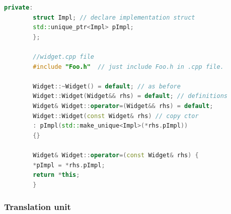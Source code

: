 \documentclass[a4paper,12pt,twoside]{book}
\begin{document}
\begin{itemize}
\begin{enumerate}
\begin{lstlisting}[frame=single, language=c++, mathescape=true]
        private:
        struct Impl; // declare implementation struct
        std::unique_ptr<Impl> pImpl;
        };
        
        //widget.cpp file
        #include "Foo.h"  // just include Foo.h in .cpp file.
        
        Widget::~Widget() = default; // as before
        Widget::Widget(Widget&& rhs) = default; // definitions
        Widget& Widget::operator=(Widget&& rhs) = default;
        Widget::Widget(const Widget& rhs) // copy ctor
        : pImpl(std::make_unique<Impl>(*rhs.pImpl))
        {}
        
        Widget& Widget::operator=(const Widget& rhs) {
        *pImpl = *rhs.pImpl;
        return *this;
        }
        \end{lstlisting}
        
    \end{enumerate}
    
    
\end{itemize}



\subsubsection{Translation unit}
\end{document}
